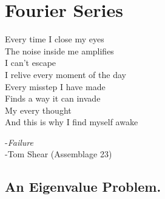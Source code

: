 \flushbottom






\chapter{Fourier Series}






\begin{tabbing}
  Every time I close my eyes \\
  The noise inside me amplifies \\
  I can't escape \\
  I relive every moment of the day \\
  Every misstep I have made \\
  Finds a way it can invade \\
  My every thought \\
  And this is why I find myself awake
\end{tabbing}

\begin{flushright}
  -\textit{Failure}\\
  -Tom Shear (Assemblage 23)
\end{flushright}






\section{An Eigenvalue Problem.}



